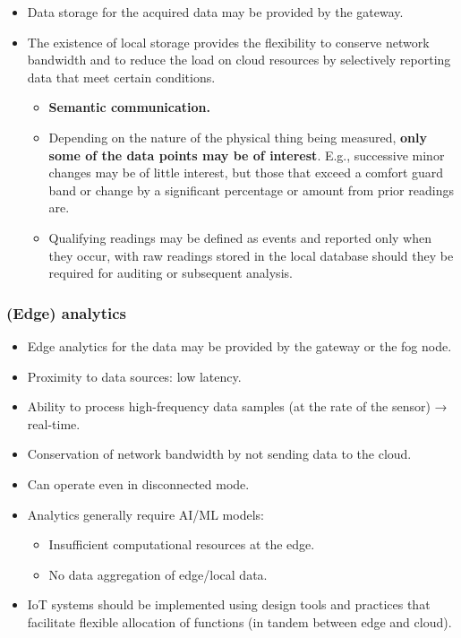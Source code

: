 \documentclass[
]{article}
\providecommand{\tightlist}{%
  \setlength{\itemsep}{0pt}\setlength{\parskip}{0pt}}
\begin{document}
\begin{itemize}
\tightlist
\item
  Data storage for the acquired data may be provided by the gateway.
\item
  The existence of local storage provides the flexibility to conserve
  network bandwidth and to reduce the load on cloud resources by
  selectively reporting data that meet certain conditions.

  \begin{itemize}
  \tightlist
  \item
    \textbf{Semantic communication.}
  \item
    Depending on the nature of the physical thing being measured,
    \textbf{only some of the data points may be of interest}. E.g.,
    successive minor changes may be of little interest, but those that
    exceed a comfort guard band or change by a significant percentage or
    amount from prior readings are.
  \item
    Qualifying readings may be defined as events and reported only when
    they occur, with raw readings stored in the local database should
    they be required for auditing or subsequent analysis.
  \end{itemize}
\end{itemize}

\subsubsection{(Edge) analytics}\label{edge-analytics}

\begin{itemize}
\tightlist
\item
  Edge analytics for the data may be provided by the gateway or the fog
  node.
\item
  Proximity to data sources: low latency.
\item
  Ability to process high-frequency data samples (at the rate of the
  sensor) → real-time.
\item
  Conservation of network bandwidth by not sending data to the cloud.
\item
  Can operate even in disconnected mode.
\item
  Analytics generally require AI/ML models:

  \begin{itemize}
  \tightlist
  \item
    Insufficient computational resources at the edge.
  \item
    No data aggregation of edge/local data.
  \end{itemize}
\item
  IoT systems should be implemented using design tools and practices
  that facilitate flexible allocation of functions (in tandem between
  edge and cloud).
\end{itemize}
\end{document}
